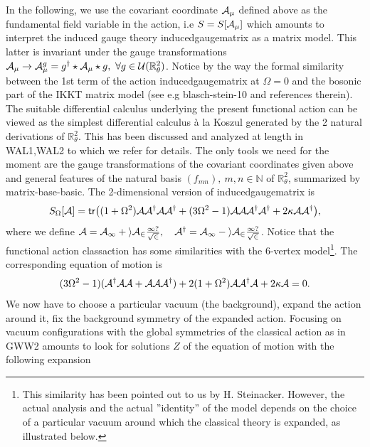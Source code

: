 \documentclass[10pt]{book}
\newcommand{\tr}{\mathsf{tr}}
\theoremstyle{break}
\begin{document}
In the following, we use the covariant coordinate ${\cal{A}}_\mu$  defined above as the fundamental field variable in the action, i.e $S=S[{\cal{A}}_\mu]$ which amounts to interpret the induced gauge theory {inducedgaugematrix} as a matrix model. This latter is invariant under the gauge transformations ${\cal{A}}_\mu\rightarrow{\cal{A}}_\mu^g=g^\dag\star{\cal{A}}_\mu\star g,\ \forall g\in{\cal{U}}(\mathbb{R}^2_\theta)$. Notice by the way the formal similarity between the 1st term of the action {inducedgaugematrix} at $\Omega=0$ and the bosonic part of the IKKT matrix model (see e.g {blasch-stein-10} and references therein). The suitable differential calculus underlying the present functional action can be viewed as the simplest differential calculus \`a la Koszul generated by the 2 natural derivations of $\mathbb{R}^2_\theta$. This has been discussed and analyzed at length in {WAL1,WAL2} to which we refer for details. The only tools we need for the moment are the gauge transformations 
of the covariant coordinates given above and general features of the natural basis $(f_{mn}),\ m,n\in\mathbb{N}$ of $\mathbb{R}^2_\theta$, summarized by matrix-base-basic. The 2-dimensional version of inducedgaugematrix is
\begin{equation}
S_\Omega[\mathcal{A}]=\tr\big((1+\Omega^2){\cal{A}}{\cal{A}^\dag}{\cal{A}}{\cal{A}}^\dag+(3\Omega^2-1){\cal{A}}{\cal{A}}{\cal{A}}^\dag{\cal{A}}^\dag+
2\kappa{\cal{A}}
{\cal{A}}^\dag\big),
\end{equation}
where we define $\cal{A}=\cal{A}_1+i\cal{A}_2\frac{1?}{\sqrt{2}},\quad {{\cal{A}}}^\dag={{{\cal{A}}_1-i{\cal{A}}_2}\frac{1?}{\sqrt{2}}}$.
Notice that the functional action {classaction} has some similarities with the 6-vertex model\footnote{This similarity has been pointed out to us by H. Steinacker. However, the actual analysis and the actual ''identity'' of the model depends on the choice of a particular vacuum around which the classical theory is expanded, as illustrated below.}. The corresponding equation of motion is 
\begin{equation}
(3\Omega^2-1)({\cal{A}}^\dag{\cal{A}}{\cal{A}}+{\cal{A}}{\cal{A}}{\cal{A}}^\dag)+2(1+\Omega^2){\cal{A}}{\cal{A}}^\dag{\cal{A}}+2\kappa{\cal{A}}=0.
\end{equation}
We now have to choose a particular vacuum (the background), expand the action around it, fix the background symmetry of the expanded action. Focusing on vacuum configurations with the global symmetries of the classical action as in {GWW2} amounts to look for solutions $Z$ of the equation of motion with the following expansion
\end{document}
